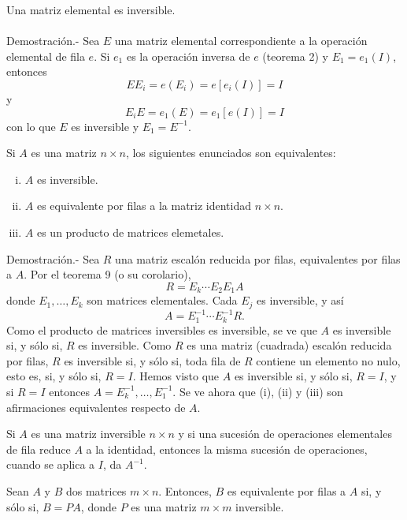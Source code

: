 \begin{teo}
    Una matriz elemental es inversible.\\\\
    	Demostración.-\; Sea $E$ una matriz elemental correspondiente a la operación elemental de fila $e$. Si $e_1$ es la operación inversa de $e$ (teorema 2) y $E_1=e_1(I)$, entonces
	$$EE_i=e(E_i)=e\left[e_i(I)\right]=I$$
	y
	$$E_iE=e_1(E)=e_1\left[e(I)\right]=I$$
	con lo que $E$ es inversible y $E_1=E^{-1}.$
\end{teo}

\begin{teo}
    Si $A$ es una matriz $n\times n$, los siguientes enunciados son equivalentes:
    \begin{enumerate}[(i)]
	\item $A$ es inversible.
	\item $A$ es equivalente por filas a la matriz identidad $n\times n$.
	\item $A$ es un producto de matrices elemetales.\\
    \end{enumerate}
	Demostración.-\; Sea $R$ una matriz escalón reducida por filas, equivalentes por filas a $A$. Por el teorema 9 (o su corolario),
	$$R=E_k\cdots E_2E_1A$$
	donde $E_1,\ldots,E_k$ son matrices elementales. Cada $E_j$ es inversible, y así
	$$A=E_1^{-1}\cdots E_k^{-1}R.$$
	Como el producto de matrices inversibles es inversible, se ve que $A$ es inversible si, y sólo si, $R$ es inversible. Como $R$ es una matriz (cuadrada) escalón reducida por filas, $R$ es inversible si, y sólo si, toda fila de $R$ contiene un elemento no nulo, esto es, si, y sólo si, $R=I$. Hemos visto que $A$ es inversible si, y sólo si, $R=I$, y si $R=I$ entonces $A=E_k^{-1}, \ldots , E_1^{-1}$. Se ve ahora que (i), (ii) y (iii) son afirmaciones equivalentes respecto de $A$.
\end{teo}

\begin{cor}
    Si $A$ es una matriz inversible $n\times n$ y si una sucesión de operaciones elementales de fila reduce $A$ a la identidad, entonces la misma sucesión de operaciones, cuando se aplica a $I$, da $A^{-1}$. 
\end{cor}

\begin{cor}
    Sean $A$ y $B$ dos matrices $m\times n$. Entonces, $B$ es equivalente por filas a $A$ si, y sólo si, $B=PA$, donde $P$ es una matriz $m\times m$ inversible.
\end{cor}

